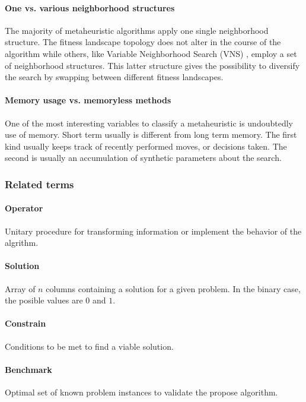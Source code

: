 \paragraph{One vs. various neighborhood structures}
The majority of metaheuristic algorithms apply one single neighborhood structure. The fitness landscape topology does not alter in the course of the algorithm while others, like Variable Neighborhood Search (VNS) \cite{DBLP:journals/anor/SarasolaDSA16}, employ a set of neighborhood structures. This latter structure gives the possibility to diversify the search by swapping between different fitness landscapes.

\paragraph{Memory usage vs. memoryless methods}
One of the most interesting variables to classify a metaheuristic is undoubtedly use of memory. Short term usually is different from long term memory. The first kind usually keeps track of recently performed moves, or decisions taken. The second is usually an accumulation of synthetic parameters about the search. 

\subsubsection{Related terms}
\paragraph{Operator} 
Unitary procedure for transforming information or implement the behavior of the algrithm.

\paragraph{Solution} 
Array of $n$ columns containing a solution for a given problem. In the binary case, the posible values are $0$ and $1$.

\paragraph{Constrain} 
Conditions to be met to find a viable solution.

\paragraph{Benchmark} 
Optimal set of known problem instances to validate the propose algorithm.

